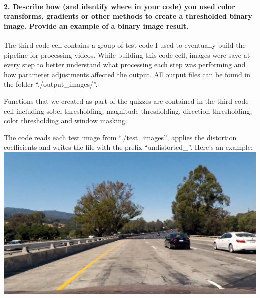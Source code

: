 \documentclass[11pt]{article}
\makeatletter
\def\maxwidth{\ifdim\Gin@nat@width>\linewidth\linewidth
    \else\Gin@nat@width\fi}
\let\Oldincludegraphics\includegraphics
\renewcommand{\includegraphics}[1]{\Oldincludegraphics[width=.8\maxwidth]{#1}}
\makeatother
\begin{document}
\hypertarget{describe-how-and-identify-where-in-your-code-you-used-color-transforms-gradients-or-other-methods-to-create-a-thresholded-binary-image.-provide-an-example-of-a-binary-image-result.}{%
\paragraph{2. Describe how (and identify where in your code) you used
color transforms, gradients or other methods to create a thresholded
binary image. Provide an example of a binary image
result.}\label{describe-how-and-identify-where-in-your-code-you-used-color-transforms-gradients-or-other-methods-to-create-a-thresholded-binary-image.-provide-an-example-of-a-binary-image-result.}}

The third code cell contains a group of test code I used to eventually
build the pipeline for processing videos. While building this code cell,
images were save at every step to better understand what processing each
step was performing and how parameter adjustments affected the output.
All output files can be found in the folder ``./output\_images/''.

Functions that we created as part of the quizzes are contained in the
third code cell including sobel thresholding, magnitude thresholding,
direction thresholding, color thresholding and window masking.

The code reads each test image from ``./test\_images'', applies the
distortion coefficients and writes the file with the prefix
``undistorted\_''. Here's an example:
\includegraphics{./output_images/undistorted_test1.jpg}
\end{document}
